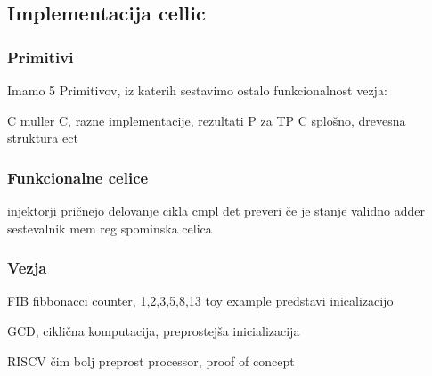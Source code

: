 \subsection{Implementacija cellic} \label{a}

\subsubsection{Primitivi} \label{b}
Imamo 5 Primitivov, iz katerih sestavimo ostalo funkcionalnost vezja:

C muller C, razne implementacije, rezultati
P za TP
C splošno, drevesna struktura
ect


\subsubsection{Funkcionalne celice} \label{b}
injektorji pričnejo delovanje cikla
cmpl det preveri če je stanje validno
adder sestevalnik
mem reg spominska celica


\subsubsection{Vezja} \label{b}
FIB fibbonacci counter, 1,2,3,5,8,13 toy example predstavi inicalizacijo

GCD, ciklična komputacija, preprostejša inicializacija

RISCV čim bolj preprost processor, proof of concept




